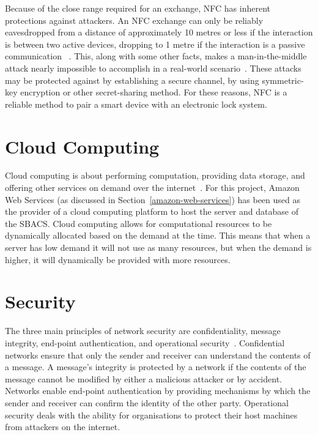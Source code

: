 \documentclass[12pt]{report}
\let\Oldsection\section
\renewcommand{\section}{\FloatBarrier\Oldsection}
\begin{document}
Because of the close range required for an exchange, NFC has inherent protections against attackers. An NFC exchange
can only be reliably eavesdropped from a distance of approximately 10 metres or less if the interaction is between two 
active devices, dropping to 1 metre if the interaction is a passive communication ~\autocite{NFCSECURITY}. This, along 
with some other facts, makes a man-in-the-middle attack nearly impossible to accomplish in a real-world 
scenario~\autocite{NFCSECURITY}. These attacks may be protected against by establishing a secure channel, by using 
symmetric-key encryption or other secret-sharing method. For these reasons, NFC is a reliable method to pair a smart 
device with an electronic lock system.


\section{Cloud Computing} \label{cloud-computing}

Cloud computing is about performing computation, providing data storage, and offering other services
on demand over the internet~\autocite{CLOUDCOMPUTING}. For this project, Amazon Web Services (as discussed
in Section~\ref{amazon-web-services})
has been used as the provider of a cloud computing platform to host the server and database of the SBACS.
Cloud computing allows for computational resources to be dynamically allocated based on the demand
at the time. This means that when a server has low demand it will not use as many resources, but when
the demand is higher, it will dynamically be provided with more resources.


\section{Security} \label{security}


The three main principles of network security are confidentiality, message integrity, end-point authentication, and
operational security~\autocite{NETWORKTEXTBOOK}. Confidential networks ensure that only the sender and receiver can
understand the contents of a message. A message's integrity is protected by a network if the contents of the message
cannot be modified by either a malicious attacker or by accident. Networks enable end-point authentication by providing
mechanisms by which the sender and receiver can confirm the identity of the other party. Operational security deals with
the ability for organisations to protect their host machines from attackers on the internet.
\end{document}
